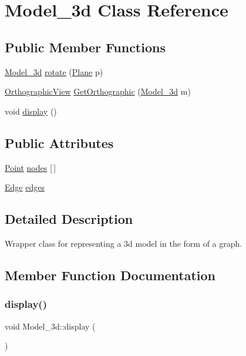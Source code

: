 \hypertarget{class_model__3d}{}\section{Model\+\_\+3d Class Reference}
\label{class_model__3d}
\subsection*{Public Member Functions}
\begin{DoxyCompactItemize}
\item 
\hyperlink{class_model__3d}{Model\+\_\+3d} \hyperlink{class_model__3d_a94058b3f100e52c53b44a5b76308115e}{rotate} (\hyperlink{class_plane}{Plane} p)
\item 
\hyperlink{class_orthographic_view}{Orthographic\+View} \hyperlink{class_model__3d_ac19b2e10ea54b9e9772d5a4062cc2b9a}{Get\+Orthographic} (\hyperlink{class_model__3d}{Model\+\_\+3d} m)
\item 
void \hyperlink{class_model__3d_ab4a30d52c27ec1c56f8d1928c4db5e88}{display} ()
\end{DoxyCompactItemize}
\subsection*{Public Attributes}
\begin{DoxyCompactItemize}
\item 
\hyperlink{class_point}{Point} \hyperlink{class_model__3d_a9872f3156fbcdd16fff4124fdcf60a06}{nodes} \mbox{[}$\,$\mbox{]}
\item 
\hyperlink{class_edge}{Edge} \hyperlink{class_model__3d_ab171a592efc8e90124f65404b46051cc}{edges}
\end{DoxyCompactItemize}


\subsection{Detailed Description}
Wrapper class for representing a 3d model in the form of a graph. 

\subsection{Member Function Documentation}
\mbox{\label{class_model__3d_ab4a30d52c27ec1c56f8d1928c4db5e88}} 
\subsubsection{\texorpdfstring{display()}{display()}}
{\footnotesize\ttfamily void Model\+\_\+3d\+::display (\begin{DoxyParamCaption}{ }\end{DoxyParamCaption})}

